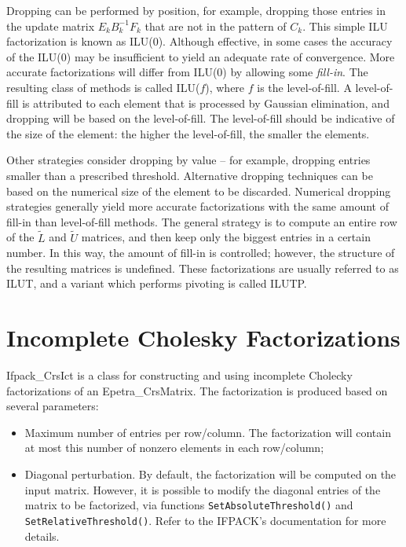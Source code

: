 Dropping can be performed
by position, for example, dropping those entries in the update matrix
$E_k B_k^{-1} F_k$ that are not in the pattern of $C_k$. 
This simple ILU factorization is known as ILU(0). Although effective, in
some cases the accuracy of the ILU(0) may be insufficient to yield an
adequate rate of convergence. More accurate factorizations will differ
from ILU(0) by allowing some {\em fill-in}. The resulting class of
methods is called ILU($f$), where $f$ is the level-of-fill. A
level-of-fill is attributed to each element that is processed by
Gaussian elimination, and dropping will be based on the level-of-fill.
The level-of-fill should be indicative of the size of the element: the
higher the level-of-fill, the smaller the elements.  

Other strategies consider dropping by value -- for example, dropping
entries smaller than a prescribed threshold. Alternative dropping
techniques can be based on the numerical size of the element to be
discarded. Numerical dropping strategies generally yield more accurate
factorizations with the same amount of fill-in than level-of-fill
methods. The general strategy is to compute an entire row of the
$\tilde{L}$ and $\tilde{U}$ matrices, and then keep only the biggest
entries in a certain number. In this way, the amount of fill-in is
controlled; however, the structure of the resulting matrices is
undefined. These factorizations are usually referred to as ILUT, and a
variant which performs pivoting is called ILUTP.


\section{Incomplete Cholesky Factorizations}
\label{sec:ifpack_chol}

Ifpack\_CrsIct is a class for constructing and using incomplete Cholecky
factorizations of an Epetra\_CrsMatrix. The factorization is produced
based on several parameters:
\begin{itemize}
\item Maximum number of entries per row/column. The factorization
  will contain at most this number of nonzero elements in each
  row/column;
\item Diagonal perturbation.  By default, the factorization will be
  computed on the input matrix. However, it is possible to modify the
  diagonal entries of the matrix to be factorized, via functions
  \verb!SetAbsoluteThreshold()! and \verb!SetRelativeThreshold()!. Refer
  to the IFPACK's documentation for more details.
\end{itemize}

